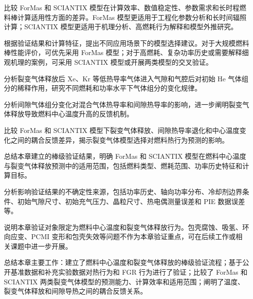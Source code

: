 比较 ForMas 和 SCIANTIX 模型在计算效率、数值稳定性、参数需求和长时程燃料棒计算适用性方面的差异。ForMas 模型更适用于工程化参数分析和长时间辐照计算；SCIANTIX 模型更适用于机理分析、高燃耗行为解释和模型外推研究。


根据验证结果和计算特征，提出不同应用场景下的模型选择建议。对于大规模燃料棒性能评价，可优先采用 ForMas 模型；对于高燃耗、复杂功率历史或需要解释细观机理的案例，可采用 SCIANTIX 模型或开展两类模型的交叉验证。



分析裂变气体释放后 Xe、Kr 等低热导率气体进入气隙和气腔后对初始 He 气体组分的稀释作用，研究不同燃耗和功率水平下气体组分的变化规律。

分析间隙气体组分变化对混合气体热导率和间隙热导率的影响，进一步阐明裂变气体释放导致燃料中心温度升高的反馈机制。


比较 ForMas 和 SCIANTIX 模型下裂变气体释放、间隙热导率退化和中心温度变化之间的耦合反馈差异，揭示裂变气体模型选择对燃料热行为预测的影响。



总结本章建立的棒级验证结果，明确 ForMas 和 SCIANTIX 模型在燃料中心温度与裂变气体释放预测中的适用范围，包括燃料类型、燃耗范围、功率历史特征和计算目标。


分析影响验证结果的不确定性来源，包括功率历史、轴向功率分布、冷却剂边界条件、初始气隙尺寸、初始充气压力、晶粒尺寸、热电偶测量误差和 PIE 数据误差等。

说明本章验证对象限定为燃料中心温度和裂变气体释放行为。包壳腐蚀、吸氢、环向应变、PCMI 变形和包壳失效等问题不作为本章验证重点，可在后续工作或相关课题中进一步开展。

总结本章主要工作：建立了燃料中心温度和裂变气体释放的棒级验证流程；基于公开基准数据和补充实验数据对热行为和 FGR 行为进行了验证；比较了 ForMas 和 SCIANTIX 两类裂变气体模型的预测能力、计算效率和适用范围；阐明了温度、裂变气体释放和间隙导热之间的耦合反馈关系。
